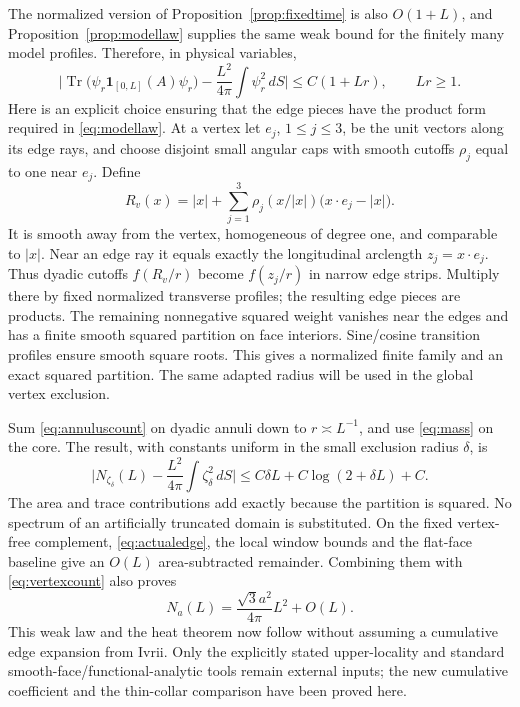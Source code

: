 \documentclass[11pt]{amsart}
\numberwithin{equation}{section}
\theoremstyle{remark}
\newcommand{\Tr}{\operatorname{Tr}}
\newcommand{\one}{\mathbf{1}}
\begin{document}
The normalized version of Proposition~\ref{prop:fixedtime} is also $O(1+L)$, and Proposition~\ref{prop:modellaw} supplies the same weak bound for the finitely many model profiles. Therefore, in physical variables,
\begin{equation}\label{eq:annuluscount}
\Big|\Tr\big(\psi_r\one_{[0,L]}(A)\psi_r\big)-\frac{L^2}{4\pi}\int\psi_r^2\,dS\Big|\le C(1+Lr),\qquad Lr\ge1 .
\end{equation}
Here is an explicit choice ensuring that the edge pieces have the product form required in \eqref{eq:modellaw}. At a vertex let $e_j$, $1\le j\le3$, be the unit vectors along its edge rays, and choose disjoint small angular caps with smooth cutoffs $\rho_j$ equal to one near $e_j$. Define
\begin{equation}\label{eq:Rv}
R_v(x)=|x|+\sum_{j=1}^3\rho_j(x/|x|)\big(x\cdot e_j-|x|\big) .
\end{equation}
It is smooth away from the vertex, homogeneous of degree one, and comparable to $|x|$. Near an edge ray it equals exactly the longitudinal arclength $z_j=x\cdot e_j$. Thus dyadic cutoffs $f(R_v/r)$ become $f(z_j/r)$ in narrow edge strips. Multiply there by fixed normalized transverse profiles; the resulting edge pieces are products. The remaining nonnegative squared weight vanishes near the edges and has a finite smooth squared partition on face interiors. Sine/cosine transition profiles ensure smooth square roots. This gives a normalized finite family and an exact squared partition. The same adapted radius will be used in the global vertex exclusion.

Sum \eqref{eq:annuluscount} on dyadic annuli down to $r\asymp L^{-1}$, and use \eqref{eq:mass} on the core. The result, with constants uniform in the small exclusion radius $\delta$, is
\begin{equation}\label{eq:vertexcount}
\Big|N_{\zeta_\delta}(L)-\frac{L^2}{4\pi}\int\zeta_\delta^2\,dS\Big|\le C\delta L+C\log(2+\delta L)+C .
\end{equation}
The area and trace contributions add exactly because the partition is squared. No spectrum of an artificially truncated domain is substituted. On the fixed vertex-free complement, \eqref{eq:actualedge}, the local window bounds and the flat-face baseline give an $O(L)$ area-subtracted remainder. Combining them with \eqref{eq:vertexcount} also proves
\begin{equation}\label{eq:weaklaw}
N_a(L)=\frac{\sqrt3a^2}{4\pi}L^2+O(L) .
\end{equation}
This weak law and the heat theorem now follow without assuming a cumulative edge expansion from Ivrii. Only the explicitly stated upper-locality and standard smooth-face/functional-analytic tools remain external inputs; the new cumulative coefficient and the thin-collar comparison have been proved here.
\end{document}
